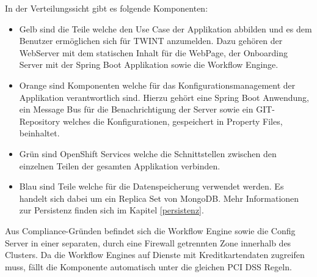 In der Verteilungssicht gibt es folgende Komponenten:\newline
\begin{itemize}
	\item Gelb sind die Teile welche den Use Case der Applikation abbilden und es dem Benutzer ermöglichen sich für TWINT anzumelden. Dazu gehören der WebServer mit dem statischen Inhalt für die WebPage, der Onboarding Server mit der Spring Boot Applikation sowie die Workflow Enginge.
	\item Orange sind Komponenten welche für das Konfigurationsmanagement der Applikation verantwortlich sind. Hierzu gehört eine Spring Boot Anwendung, ein Message Bus für die Benachrichtigung der Server sowie ein GIT-Repository welches die Konfigurationen, gespeichert in Property Files, beinhaltet.
	\item Grün sind OpenShift Services welche die Schnittstellen zwischen den einzelnen Teilen der gesamten Applikation verbinden.
	\item Blau sind Teile welche für die Datenspeicherung verwendet werden. Es handelt sich dabei um ein Replica Set von MongoDB. Mehr Informationen zur Persistenz finden sich im Kapitel \ref{persistenz}.
\end{itemize}

Aus Compliance-Gründen befindet sich die Workflow Engine sowie die Config Server in einer separaten, durch eine Firewall getrennten Zone innerhalb des Clusters. Da die Workflow Engines auf Dienste mit Kreditkartendaten zugreifen muss, fällt die Komponente automatisch unter die gleichen PCI DSS Regeln. 

